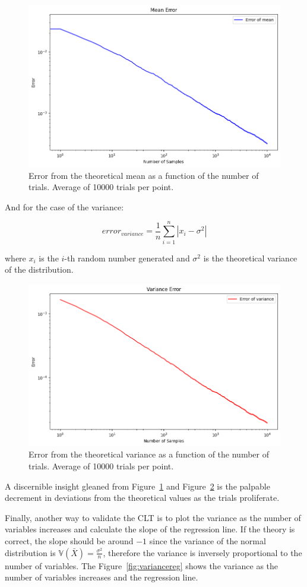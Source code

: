 \documentclass{article}
\begin{document}
\begin{figure}[H]
	\centering
	\includegraphics[width=0.5\linewidth]{./Figures/CLT/meanerror.png}
	\caption{Error from the theoretical mean as a function of the number of trials. Average of 10000 trials per point.}
	\label{fig:meanerror}
\end{figure}

And for the case of the variance:

\begin{equation*} error_{variance} = \frac{1}{n}\sum_{i=1}^{n} | x_i - \sigma^2 | \end{equation*}

where \(x_i\) is the \(i\)-th random number generated and \(\sigma^2\) is the theoretical variance of the distribution.

\begin{figure}[H]
	\centering
	\includegraphics[width=0.5\linewidth]{./Figures/CLT/varianceerror.png}
	\caption{Error from the theoretical variance as a function of the number of trials. Average of 10000 trials per point.}
	\label{fig:varianceerror}
\end{figure}

A discernible insight gleaned from Figure~\ref{fig:meanerror} and Figure~\ref{fig:varianceerror} is the palpable decrement in deviations from the theoretical values as the trials proliferate. 

Finally, another way to validate the CLT is to plot the variance as the number of variables increases and calculate the slope of the regression line. If the theory is correct, the slope should be around \(-1\) since the variance of the normal distribution is \(\mathbb{V}(\bar{X}) = \frac{\sigma^2}{n}\), therefore the variance is inversely proportional to the number of variables. The Figure~\ref{fig:variancereg} shows the variance as the number of variables increases and the regression line.
\end{document}

